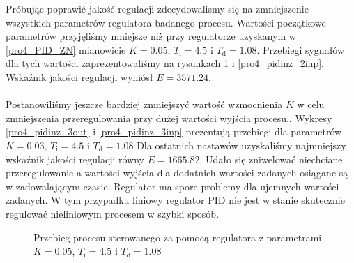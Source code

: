 \indent Próbując poprawić jakość regulacji zdecydowalismy się na zmniejszenie wszystkich 
parametrów regulatora badanego procesu.
Wartości początkowe parametrów przyjęliśmy mniejsze niż przy regulatorze uzyskanym w \ref{pro4_PID_ZN}
mianowicie $K = \num{0,05}$, $T_{\mathrm{i}} = \num{4.5}$ i $T_{\mathrm{d}} = \num{1.08}$. 
Przebiegi sygnałów dla tych wartości zaprezentowaliśmy na rysunkach \ref{pro4_pidinz_2out} i 
\ref{pro4_pidinz_2inp}. Wskaźnik jakości regulacji 
wyniósł $E = \num{3571.24}$. \\
\\
\indent Postanowiliśmy jeszcze bardziej zmniejszyć wartość
wzmocnienia  $K$ w celu zmniejszenia przeregulowania przy dużej wartości wyjścia procesu.. 
Wykresy \ref{pro4_pidinz_3out} i \ref{pro4_pidinz_3inp} 
prezentują przebiegi dla parametrów $K = \num{0,03}$, $T_{\mathrm{i}} = \num{4.5}$ 
i $T_{\mathrm{d}} = \num{1.08}$ Dla ostatnich nastawów uzyskaliśmy najmniejszy 
wskaźnik jakości regulacji równy $E = \num{1665.82}$. Udało się zniwelować 
niechciane przeregulowanie a wartości wyjścia dla dodatnich wartości zadanych osiągane są 
w zadowalającym czasie. Regulator ma spore problemy dla ujemnych wartości zadanych. W tym przypadku
liniowy regulator PID nie jest w stanie skutecznie regulować nieliniowym procesem w szybki sposób.

\begin{figure}[t]
    \centering
    \caption{Przebieg procesu sterowanego za pomocą regulatora z parametrami $K = \num{0,05}$, $T_{\mathrm{i}} = \num{4.5}$ i $T_{\mathrm{d}} = \num{1.08}$}
    \label{pro4_pidinz_2out}
\end{figure}

